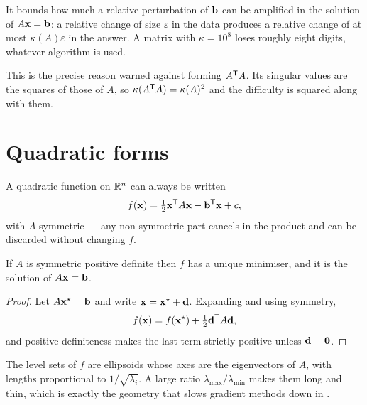 It bounds how much a relative perturbation of \(\mathbf{b}\) can be amplified in
the solution of \(A\mathbf{x}=\mathbf{b}\): a relative change of size \(\varepsilon\)
in the data produces a relative change of at most \(\kappa(A)\varepsilon\) in the
answer. A matrix with \(\kappa=10^{8}\) loses roughly eight digits, whatever
algorithm is used.

\begin{remark}
This is the precise reason  warned against forming
\(A^{\mathsf{T}} A\). Its singular values are the squares of those of \(A\), so
\(\kappa(A^{\mathsf{T}} A)=\kappa(A)^{2}\) and the difficulty is squared along with them.
\end{remark}

\section{Quadratic forms}

A quadratic function on \(\mathbb{R}^{n}\) can always be written
\[
	f(\mathbf{x})=\tfrac12\mathbf{x}^{\mathsf{T}} A\mathbf{x}-\mathbf{b}^{\mathsf{T}}\mathbf{x}+c,
\]
with \(A\) symmetric --- any non-symmetric part cancels in the product and can be
discarded without changing \(f\).

\begin{theorem}
If \(A\) is symmetric positive definite then \(f\) has a unique minimiser, and it
is the solution of \(A\mathbf{x}=\mathbf{b}\).
\end{theorem}

\begin{proof}
Let \(A\mathbf{x}^{\star}=\mathbf{b}\) and write \(\mathbf{x}=\mathbf{x}^{\star}+\mathbf{d}\).
Expanding and using symmetry,
\[
	f(\mathbf{x})=f(\mathbf{x}^{\star})+\tfrac12\mathbf{d}^{\mathsf{T}} A\mathbf{d},
\]
and positive definiteness makes the last term strictly positive unless
\(\mathbf{d}=\mathbf{0}\).
\end{proof}


The level sets of \(f\) are ellipsoids whose axes are the eigenvectors of \(A\),
with lengths proportional to \(1/\sqrt{\lambda_i}\). A large ratio
\(\lambda_{\max}/\lambda_{\min}\) makes them long and thin, which is exactly the
geometry that slows gradient methods down in .

